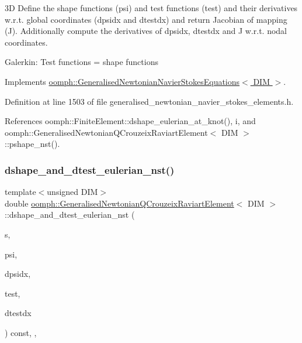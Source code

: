 3D Define the shape functions (psi) and test functions (test) and their derivatives w.\+r.\+t. global coordinates (dpsidx and dtestdx) and return Jacobian of mapping (J). Additionally compute the derivatives of dpsidx, dtestdx and J w.\+r.\+t. nodal coordinates.

Galerkin\+: Test functions = shape functions 

Implements \hyperlink{classoomph_1_1GeneralisedNewtonianNavierStokesEquations_a24a93b73dba66e04eabb9b37a9360daa}{oomph\+::\+Generalised\+Newtonian\+Navier\+Stokes\+Equations$<$ D\+I\+M $>$}.



Definition at line 1503 of file generalised\+\_\+newtonian\+\_\+navier\+\_\+stokes\+\_\+elements.\+h.



References oomph\+::\+Finite\+Element\+::dshape\+\_\+eulerian\+\_\+at\+\_\+knot(), i, and oomph\+::\+Generalised\+Newtonian\+Q\+Crouzeix\+Raviart\+Element$<$ D\+I\+M $>$\+::pshape\+\_\+nst().

\mbox{\label{classoomph_1_1GeneralisedNewtonianQCrouzeixRaviartElement_a815dca7d5b556835865c7691e547bc37}} 
\subsubsection{\texorpdfstring{dshape\+\_\+and\+\_\+dtest\+\_\+eulerian\+\_\+nst()}{dshape\_and\_dtest\_eulerian\_nst()}}
{\footnotesize\ttfamily template$<$unsigned D\+IM$>$ \\
double \hyperlink{classoomph_1_1GeneralisedNewtonianQCrouzeixRaviartElement}{oomph\+::\+Generalised\+Newtonian\+Q\+Crouzeix\+Raviart\+Element}$<$ D\+IM $>$\+::dshape\+\_\+and\+\_\+dtest\+\_\+eulerian\+\_\+nst (\begin{DoxyParamCaption}\item[{const \hyperlink{classoomph_1_1Vector}{Vector}$<$ double $>$ \&}]{s,  }\item[{\hyperlink{classoomph_1_1Shape}{Shape} \&}]{psi,  }\item[{\hyperlink{classoomph_1_1DShape}{D\+Shape} \&}]{dpsidx,  }\item[{\hyperlink{classoomph_1_1Shape}{Shape} \&}]{test,  }\item[{\hyperlink{classoomph_1_1DShape}{D\+Shape} \&}]{dtestdx }\end{DoxyParamCaption}) const\hspace{0.3cm}{\ttfamily [inline]}, {\ttfamily [protected]}, {\ttfamily [virtual]}}



